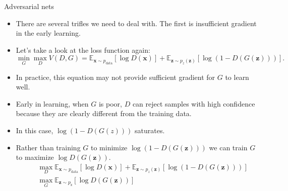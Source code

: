 \documentclass[10pt]{beamer}
\begin{document}
	\begin{frame}{Adversarial nets}
		\begin{itemize}
			\item There are several trifles we need to deal with. The first is insufficient gradient in the early learning.
			\pause
			\item Let's take a look at the loss function again:
			\pause
			$$
			\mathop{\min}_{G}\mathop{\max}_{D}V(D,G)=\mathbb{E}_{\bm{x}\sim p_{\text{data}}}\left[\log D(\bm{x})\right]+\mathbb{E}_{\bm{z}\sim p_z(\bm{z})}\left[\log(1-D(G(\bm{z})))\right].
			$$
			\pause
			\item In practice, this equation may not provide sufficient gradient for $G$ to learn well.
			\pause
			\item Early in learning, when $G$ is poor, $D$ can reject samples with high confidence because they are clearly different from the training data.
			\pause
			\item In this case, $\log(1-D(G(z)))$ saturates.
			\pause
			\item Rather than training $G$ to minimize $\log(1-D(G(\bm{z})))$ we can train $G$ to maximize $\log D(G(\bm{z}))$.
			\pause
			\begin{eqnarray*}
			&&\mathop{\max}_{D}\mathbb{E}_{\bm{x}\sim p_{\text{data}}}\left[\log D(\bm{x})\right]+\mathbb{E}_{\bm{z}\sim p_z(\bm{z})}\left[\log(1-D(G(\bm{z})))\right] \\
			&&\mathop{\max}_{G}\mathbb{E}_{\bm{z}\sim p_{\text{z}}}\left[\log D(G(\bm{z}))\right]
			\end{eqnarray*}
		\end{itemize}
	\end{frame}
\end{document}
